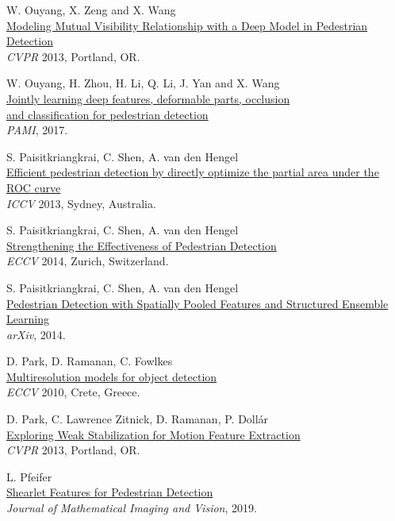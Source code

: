 \documentclass[onecolumn]{article}
\begin{document}
\begin{thebibliography}{1}
W. Ouyang, X. Zeng and X. Wang\\
\href{http://mmlab.ie.cuhk.edu.hk/projects/ouyangZWcvpr13MutVisibility/index.html}{
Modeling Mutual Visibility Relationship with a Deep Model in Pedestrian Detection}\\
\textit{CVPR} 2013, Portland, OR.

W. Ouyang, H. Zhou, H. Li, Q. Li, J. Yan and X. Wang\\
\href{http://ieeexplore.ieee.org/document/8008790/}{
Jointly learning deep features, deformable parts, occlusion\\
and classification for pedestrian detection}\\
\textit{PAMI}, 2017.

S. Paisitkriangkrai, C. Shen, A. van den Hengel\\
\href{http://arxiv.org/abs/1310.0900}{
Efficient pedestrian detection by directly optimize the partial area under the ROC curve}\\
\textit{ICCV} 2013, Sydney, Australia.

S. Paisitkriangkrai, C. Shen, A. van den Hengel\\
\href{http://arxiv.org/abs/1407.0786}{
Strengthening the Effectiveness of Pedestrian Detection}\\
\textit{ECCV} 2014, Zurich, Switzerland.

S. Paisitkriangkrai, C. Shen, A. van den Hengel\\
\href{http://arxiv.org/abs/1409.5209}{
Pedestrian Detection with Spatially Pooled Features and Structured Ensemble Learning}\\
\textit{arXiv}, 2014.

D. Park, D. Ramanan, C. Fowlkes\\
\href{http://vision.ics.uci.edu/papers/ParkRF_ECCV_2010}{
Multiresolution models for object detection}\\
\textit{ECCV} 2010, Crete, Greece.

D. Park, C. Lawrence Zitnick, D. Ramanan, P. Doll\'ar\\
\href{http://vision.ucsd.edu/~pdollar/files/papers/ParkCVPR13MotionFtrs.pdf}{
Exploring Weak Stabilization for Motion Feature Extraction}\\
\textit{CVPR} 2013, Portland, OR.

L. Pfeifer\\
\href{https://doi.org/10.1007/s10851-018-0834-9}{
Shearlet Features for Pedestrian Detection}\\
\textit{Journal of Mathematical Imaging and Vision}, 2019.


\end{thebibliography}
\end{document}
